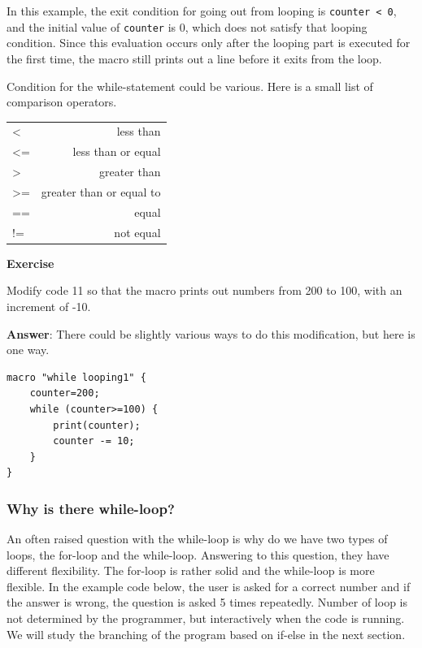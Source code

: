 \documentclass[11pt,a4paper,oneside]{report}
\newenvironment{indentexercise}[1]
{{\setlength{\leftmargin}{2em}}
\textbf{Exercise \thesubsection-#1}
\begin{list}{}
	\item
}
{\end{list}}
\newenvironment{indentCom}
{\begin{list}{}
         {\setlength{\leftmargin}{1em}}
         \item[]
}
{\end{list}}
\newcommand{\ilcom}[1]{\texttt{\small#1}}
\begin{document}
In this example, the exit condition for going out from looping is \ilcom{counter < 0}, and the initial value of \ilcom{counter} is 0, which does not satisfy that looping condition. Since this evaluation occurs only after the looping part is executed for the first time, the macro still prints out a line before it exits from the loop.  


Condition for the while-statement could be various. Here is a small list of comparison operators.

\begin{indentCom}
 \begin{tabular*}{0.5\textwidth}{ l r }
< & less than \\
<= & less than or equal\\ 
> & greater than\\ 
>= & greater than or equal to\\
== & equal\\
!= & not equal\\
 \end{tabular*}
\end{indentCom}

\begin{indentexercise}{3}
Modify code 11 so that the macro prints out numbers from 200 to 100, with an increment of -10. 

\item \textbf{Answer}: There could be slightly various ways to do this modification, but here is one way. 
	\begin{lstlisting}
macro "while looping1" {
	counter=200;
	while (counter>=100) {
		print(counter);
		counter -= 10;
	}
}
\end{lstlisting}

\end{indentexercise}


\subsubsection{Why is there while-loop?}

An often raised question with the while-loop is why do we have two types of loops, 
the for-loop and the while-loop. Answering to this question, they have different
flexibility. The for-loop is rather solid and the while-loop is more flexible. In the
example code below, the user is asked for a correct number and if the answer is wrong, the
question is asked 5 times repeatedly. Number of loop is not determined by the
programmer, but interactively when the code is running. We will study
the branching of the program based on if-else in the next section.  
\end{document}
